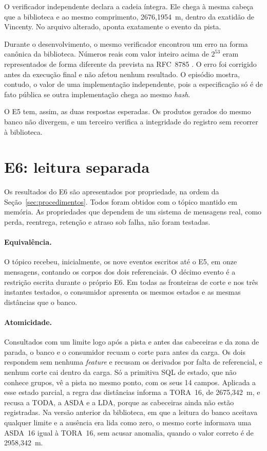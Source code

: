 O verificador independente declara a cadeia íntegra. Ele chega à mesma cabeça que a biblioteca e ao mesmo comprimento, 2676,1954~m, dentro da exatidão de Vincenty. No arquivo alterado, aponta exatamente o evento da pista.

Durante o desenvolvimento, o mesmo verificador encontrou um erro na forma canônica da biblioteca. Números reais com valor inteiro acima de $2^{53}$ eram representados de forma diferente da prevista na RFC~8785 \cite{rfc8785}. O erro foi corrigido antes da execução final e não afetou nenhum resultado. O episódio mostra, contudo, o valor de uma implementação independente, pois a especificação só é de fato pública se outra implementação chega ao mesmo \textit{hash}.

O E5 tem, assim, as duas respostas esperadas. Os produtos gerados do mesmo banco não divergem, e um terceiro verifica a integridade do registro sem recorrer à biblioteca.

\section{E6: leitura separada}\label{sec:res-e6}

Os resultados do E6 são apresentados por propriedade, na ordem da Seção~\ref{sec:procedimentos}. Todos foram obtidos com o tópico mantido em memória. As propriedades que dependem de um sistema de mensagens real, como perda, reentrega, retenção e atraso sob falha, não foram testadas.

\paragraph*{Equivalência.} O tópico recebeu, inicialmente, os nove eventos escritos até o E5, em onze mensagens, contando os corpos dos dois referenciais. O décimo evento é a restrição escrita durante o próprio E6. Em todas as fronteiras de corte e nos três instantes testados, o consumidor apresenta os mesmos estados e as mesmas distâncias que o banco.

\paragraph*{Atomicidade.} Consultados com um limite logo após a pista e antes das cabeceiras e da zona de parada, o banco e o consumidor recuam o corte para antes da carga. Os dois respondem sem nenhuma \textit{feature} e recusam os derivados por falta de referencial, e nenhum corte cai dentro da carga. Só a primitiva SQL de estado, que não conhece grupos, vê a pista no mesmo ponto, com os seus 14 campos. Aplicada a esse estado parcial, a regra das distâncias informa a TORA~16, de 2675,342~m, e recusa a TODA, a ASDA e a LDA, porque as cabeceiras ainda não estão registradas. Na versão anterior da biblioteca, em que a leitura do banco aceitava qualquer limite e a ausência era lida como zero, o mesmo corte informava uma ASDA~16 igual à TORA~16, sem acusar anomalia, quando o valor correto é de 2958,342~m.

